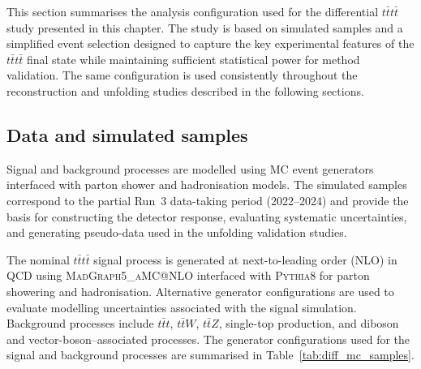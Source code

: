 This section summarises the analysis configuration used for the differential $t\bar{t}t\bar{t}$ study presented in this chapter. 
The study is based on simulated samples and a simplified event selection designed to capture the key experimental features of the $t\bar{t}t\bar{t}$ final state while maintaining sufficient statistical power for method validation. 
The same configuration is used consistently throughout the reconstruction and unfolding studies described in the following sections.

\subsection{Data and simulated samples}

Signal and background processes are modelled using MC event generators interfaced with parton shower and hadronisation models. 
The simulated samples correspond to the partial Run~3 data-taking period (2022--2024) and provide the basis for constructing the detector response, evaluating systematic uncertainties, and generating pseudo-data used in the unfolding validation studies.

The nominal $t\bar{t}t\bar{t}$ signal process is generated at next-to-leading order (NLO) in QCD using \textsc{MadGraph5\_aMC@NLO} interfaced with \textsc{Pythia8} for parton showering and hadronisation. 
Alternative generator configurations are used to evaluate modelling uncertainties associated with the signal simulation. 
Background processes include $t\bar{t}t$, $t\bar{t}W$, $t\bar{t}Z$, single-top production, and diboson and vector-boson–associated processes. 
The generator configurations used for the signal and background processes are summarised in Table~\ref{tab:diff_mc_samples}.

